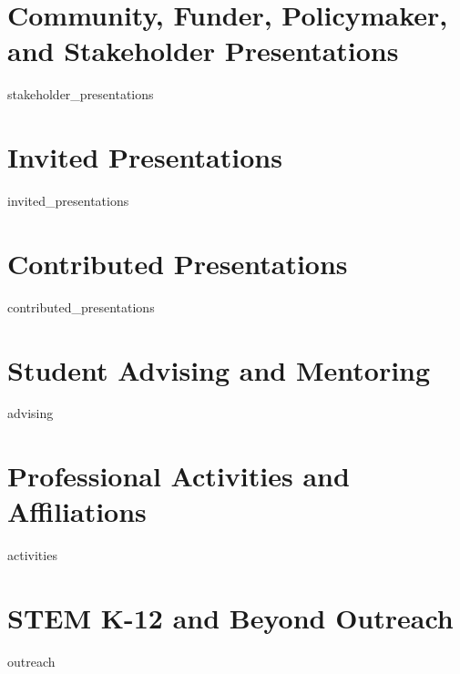 \documentclass[11pt, letterpaper, roman]{moderncv} %
\begin{document}
\section{Community, Funder, Policymaker, and Stakeholder Presentations}
{stakeholder_presentations}

\section{Invited Presentations}
{invited_presentations}

\vspace{-5pt}
\section{Contributed Presentations}
{contributed_presentations}

\section{Student Advising and Mentoring}
{advising}

\vspace{-2.5pt}
\section{Professional Activities and Affiliations}
{activities}

\section{STEM K-12 and Beyond Outreach}
{outreach}
\end{document}

